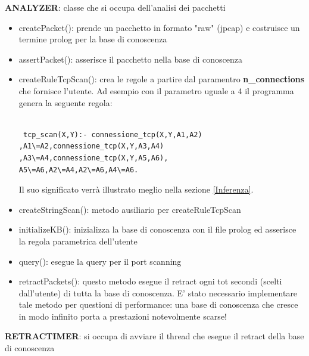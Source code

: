 \documentclass[a4paper,12pt]{article} %
\begin{document}
\textbf{ANALYZER}: classe che si occupa dell'analisi dei pacchetti



\begin{itemize}

\item createPacket(): prende un pacchetto in formato "raw" (jpcap) e costruisce un termine prolog
per la base di conoscenza

\item assertPacket(): asserisce il pacchetto nella base di conoscenza



\item createRuleTcpScan(): crea le regole a partire dal paramentro \textbf{n\_connections} che fornisce l'utente. Ad esempio con 
il parametro uguale a 4 il programma genera la seguente regola: 


\begin{lstlisting}

 tcp_scan(X,Y):- connessione_tcp(X,Y,A1,A2)
,A1\=A2,connessione_tcp(X,Y,A3,A4)
,A3\=A4,connessione_tcp(X,Y,A5,A6),
A5\=A6,A2\=A4,A2\=A6,A4\=A6.
\end{lstlisting}



Il suo significato verrà illustrato meglio nella sezione \ref{Inferenza}.





\item createStringScan(): metodo ausiliario per createRuleTcpScan



\item initializeKB(): inizializza la base di conoscenza con il file prolog ed asserisce la regola 
parametrica dell'utente

\item query(): esegue la query per il port scanning

\item retractPackets(): questo metodo esegue il retract ogni tot secondi (scelti dall'utente) di tutta la base di conoscenza.
E' stato necessario implementare tale metodo per questioni di performance: una base di conoscenza che cresce in modo infinito
porta a prestazioni notevolmente scarse!


\end{itemize}

\textbf{RETRACTIMER}: si occupa di avviare il thread che esegue il retract della base di conoscenza
\end{document}
